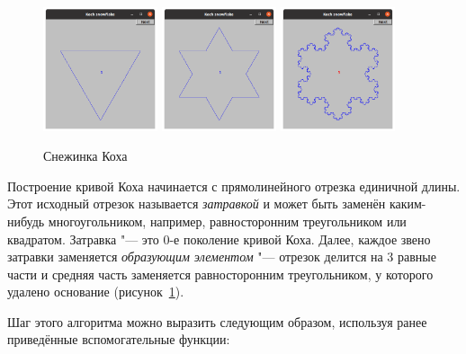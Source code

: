 \begin{figure}[ht]
    {\centering
        \includegraphics[width=0.3\textwidth]{images/koch_snowflake_n=0.png}\hfil
        \includegraphics[width=0.3\textwidth]{images/koch_snowflake_n=1.png}\hfil
        \includegraphics[width=0.3\textwidth]{images/koch_snowflake_n=5.png}

    }
    \caption{Снежинка Коха}
    \label{fig:kochshowflake}
\end{figure}

Построение кривой Коха начинается с прямолинейного отрезка единичной длины. Этот исходный отрезок называется \emph{затравкой} и может быть заменён каким-нибудь многоугольником, например, равносторонним треугольником или квадратом. Затравка "--- это \(0\)-е поколение кривой Коха. Далее, каждое звено затравки заменяется \emph{образующим элементом} "--- отрезок делится на 3 равные части и средняя часть заменяется равносторонним треугольником, у которого удалено основание (рисунок~\ref{fig:kochshowflake}).

Шаг этого алгоритма можно выразить следующим образом, используя ранее приведённые вспомогательные функции:


